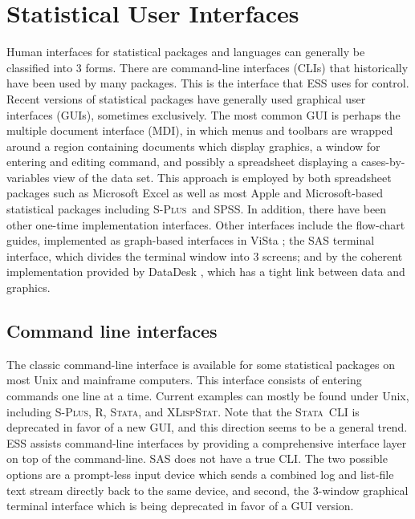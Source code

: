 \documentclass{article}
\newcommand*{\Splus}{\textsc{S-Plus}}
\newcommand*{\XLispStat}{\textsc{XLispStat}}
\newcommand*{\Stata}{\textsc{Stata}}
\begin{document}
\section{Statistical User Interfaces}
\label{sec:UI}

Human interfaces for statistical packages and languages can generally
be classified into 3 forms.  There are command-line interfaces (CLIs)
that historically have been used by many packages.  This is the
interface that ESS uses for control.  Recent versions of statistical
packages have generally used graphical user interfaces (GUIs),
sometimes exclusively.  The most common GUI is perhaps the multiple
document interface (MDI), in which menus and toolbars are wrapped
around a region containing documents which display graphics, a window
for entering and editing command, and possibly a spreadsheet
displaying a cases-by-variables view of the data set.  This approach
is employed by both spreadsheet packages such as Microsoft Excel as
well as most Apple and Microsoft-based statistical packages including
\Splus\ and SPSS.  In addition, there have been other one-time
implementation interfaces.  Other interfaces include the flow-chart
guides, implemented as graph-based interfaces in ViSta
\citep{youn:lubi:1995}; the SAS terminal interface, which divides the
terminal window into 3 screens; and by the coherent implementation
provided by DataDesk \citep{vell:prat:1989}, which has a tight link
between data and graphics.

\subsection{Command line interfaces}
\label{sec:UI:command}

The classic command-line interface is available for some statistical
packages on most Unix and mainframe computers.  This interface
consists of entering commands one line at a time.  Current examples
can mostly be found under Unix, including \Splus, R, \Stata, and
\XLispStat.  Note that the \Stata\ CLI is deprecated in favor of a new
GUI, and this direction seems to be a general trend.  ESS assists
command-line interfaces by providing a comprehensive interface layer
on top of the command-line.  SAS does not have a true CLI.  The two
possible options are a prompt-less input device which sends a combined
log and list-file text stream directly back to the same device, and
second, the 3-window graphical terminal interface which is being
deprecated in favor of a GUI version.
\end{document}
